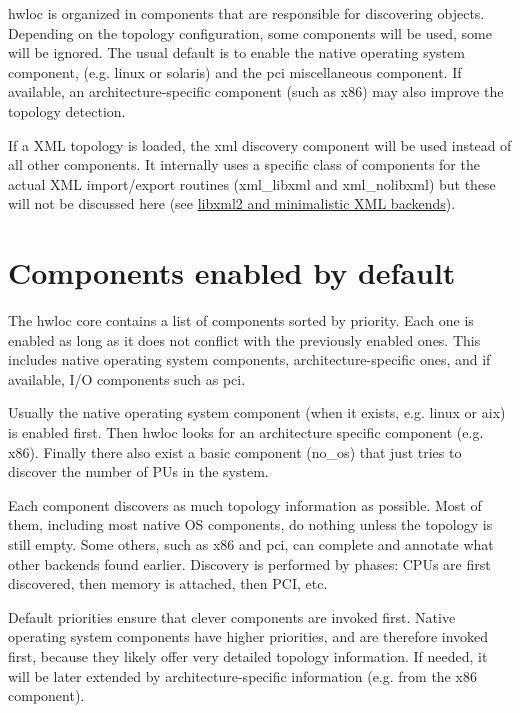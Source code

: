 

hwloc is organized in components that are responsible for discovering objects. Depending on the topology configuration, some components will be used, some will be ignored. The usual default is to enable the native operating system component, (e.\+g. {\ttfamily linux} or {\ttfamily solaris}) and the {\ttfamily pci} miscellaneous component. If available, an architecture-\/specific component (such as {\ttfamily x86}) may also improve the topology detection.

If a X\+ML topology is loaded, the {\ttfamily xml} discovery component will be used instead of all other components. It internally uses a specific class of components for the actual X\+ML import/export routines ({\ttfamily xml\+\_\+libxml} and {\ttfamily xml\+\_\+nolibxml}) but these will not be discussed here (see \hyperlink{a00388_xml_backends}{libxml2 and minimalistic X\+ML backends}).

 \hypertarget{a00392_plugins_default}{}\section{Components enabled by default}\label{a00392_plugins_default}
The hwloc core contains a list of components sorted by priority. Each one is enabled as long as it does not conflict with the previously enabled ones. This includes native operating system components, architecture-\/specific ones, and if available, I/O components such as {\ttfamily pci}.

Usually the native operating system component (when it exists, e.\+g. {\ttfamily linux} or {\ttfamily aix}) is enabled first. Then hwloc looks for an architecture specific component (e.\+g. {\ttfamily x86}). Finally there also exist a basic component ({\ttfamily no\+\_\+os}) that just tries to discover the number of P\+Us in the system.

Each component discovers as much topology information as possible. Most of them, including most native OS components, do nothing unless the topology is still empty. Some others, such as {\ttfamily x86} and {\ttfamily pci}, can complete and annotate what other backends found earlier. Discovery is performed by phases\+: C\+P\+Us are first discovered, then memory is attached, then P\+CI, etc.

Default priorities ensure that clever components are invoked first. Native operating system components have higher priorities, and are therefore invoked first, because they likely offer very detailed topology information. If needed, it will be later extended by architecture-\/specific information (e.\+g. from the {\ttfamily x86} component).

